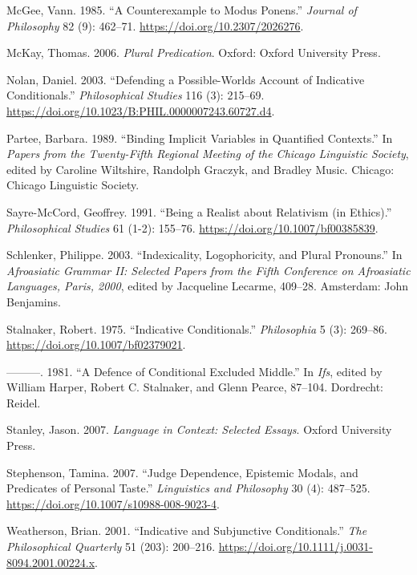 \documentclass[
  11pt,
  letterpaper,
  DIV=11,
  numbers=noendperiod,
  oneside]{scrartcl}
\newlength{\cslhangindent}
\newenvironment{CSLReferences}[2] %
 {\begin{list}{}{%
  \setlength{\itemindent}{0pt}
  \setlength{\leftmargin}{0pt}
  \setlength{\parsep}{0pt}
  \ifodd #1
   \setlength{\leftmargin}{\cslhangindent}
   \setlength{\itemindent}{-1\cslhangindent}
  \fi
  \setlength{\itemsep}{#2\baselineskip}}}
 {\end{list}}
\begin{document}
\begin{CSLReferences}{1}{0}
McGee, Vann. 1985. {``A Counterexample to Modus Ponens.''} \emph{Journal
of Philosophy} 82 (9): 462--71. \url{https://doi.org/10.2307/2026276}.

McKay, Thomas. 2006. \emph{Plural Predication}. Oxford: Oxford
University Press.

Nolan, Daniel. 2003. {``{Defending a Possible-Worlds Account of
Indicative Conditionals}.''} \emph{Philosophical Studies} 116 (3):
215--69. \url{https://doi.org/10.1023/B:PHIL.0000007243.60727.d4}.

Partee, Barbara. 1989. {``Binding Implicit Variables in Quantified
Contexts.''} In \emph{Papers from the Twenty-Fifth Regional Meeting of
the Chicago Linguistic Society}, edited by Caroline Wiltshire, Randolph
Graczyk, and Bradley Music. Chicago: Chicago Linguistic Society.

Sayre-McCord, Geoffrey. 1991. {``Being a Realist about Relativism (in
Ethics).''} \emph{Philosophical Studies} 61 (1-2): 155--76.
\url{https://doi.org/10.1007/bf00385839}.

Schlenker, Philippe. 2003. {``Indexicality, Logophoricity, and Plural
Pronouns.''} In \emph{Afroasiatic Grammar II: Selected Papers from the
Fifth Conference on Afroasiatic Languages, Paris, 2000}, edited by
Jacqueline Lecarme, 409--28. Amsterdam: John Benjamins.

Stalnaker, Robert. 1975. {``{Indicative Conditionals}.''}
\emph{Philosophia} 5 (3): 269--86.
\url{https://doi.org/10.1007/bf02379021}.

---------. 1981. {``A Defence of Conditional Excluded Middle.''} In
\emph{Ifs}, edited by William Harper, Robert C. Stalnaker, and Glenn
Pearce, 87--104. Dordrecht: Reidel.

Stanley, Jason. 2007. \emph{{Language in Context: Selected Essays}}.
Oxford University Press.

Stephenson, Tamina. 2007. {``Judge Dependence, Epistemic Modals, and
Predicates of Personal Taste.''} \emph{Linguistics and Philosophy} 30
(4): 487--525. \url{https://doi.org/10.1007/s10988-008-9023-4}.

Weatherson, Brian. 2001. {``{Indicative and Subjunctive
Conditionals}.''} \emph{The Philosophical Quarterly} 51 (203): 200--216.
\url{https://doi.org/10.1111/j.0031-8094.2001.00224.x}.

\end{CSLReferences}
\end{document}
